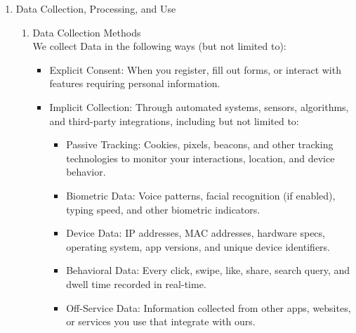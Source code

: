 \documentclass{standalone}
\begin{document}
\begin{enumerate}[label=\arabic*., noitemsep,leftmargin=*]
\begin{enumerate}[label*=\arabic*., noitemsep,leftmargin=*]
\begin{itemize}[noitemsep,leftmargin=*]
				\item [-] Use, display, and distribute your Content (including for ads, AI training, and platform improvements). 
				\item [-] Modify and translate your Content. 
				\item [-] The Company’s trademarks are its property.
			\end{itemize}
			\item Third-Party Content
			\begin{itemize}[noitemsep,leftmargin=*]
				\item [-] You are responsible for Content you upload or share, including compliance with IP laws. 
				\item [-] The Company is not liable for third-party Content unless it violates these Terms.
			\end{itemize}
		\end{enumerate}
		\item Data Collection, Processing, and Use
		\begin{enumerate}[label*=\arabic*., noitemsep,leftmargin=*]
			\item Data Collection Methods\\
			We collect Data in the following ways (but not limited to): 
			\begin{itemize}[noitemsep,leftmargin=*]
				\item [-] Explicit Consent: When you register, fill out forms, or interact with features requiring personal information. 
				\item [-] Implicit Collection: Through automated systems, sensors, algorithms, and third-party integrations, including but not limited to:
				\begin{itemize}[noitemsep,leftmargin=*]
					\item [-] Passive Tracking: Cookies, pixels, beacons, and other tracking technologies to monitor your interactions, location, and device behavior. 
					\item [-] Biometric Data: Voice patterns, facial recognition (if enabled), typing speed, and other biometric indicators. 
					\item [-] Device Data: IP addresses, MAC addresses, hardware specs, operating system, app versions, and unique device identifiers. 
					\item [-] Behavioral Data: Every click, swipe, like, share, search query, and dwell time recorded in real-time. 
					\item [-] Off-Service Data: Information collected from other apps, websites, or services you use that integrate with ours. 

\end{itemize}
\end{itemize}
\end{enumerate}
\end{enumerate}
\end{document}
